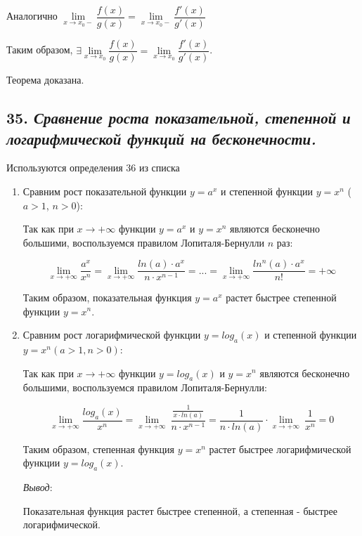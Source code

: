 Аналогично $\lim\limits_{x \rightarrow x_0-}{\dfrac{f(x)}{g(x)}}=\lim\limits_{x \rightarrow x_0-}{\dfrac{f'(x)}{g'(x)}}$

Таким образом, $\exists\lim\limits_{x \rightarrow x_0}{\dfrac{f(x)}{g(x)}}=\lim\limits_{x \rightarrow x_0}{\dfrac{f'(x)}{g'(x)}}$.

Теорема доказана.
\newpage 
\subsection*{35. \textit{Сравнение роста показательной, степенной и логарифмической функций на бесконечности.}}
\begin{Quote2} 
\small\centering 

Используются определения 36 из списка \end{Quote2} 
\begin{enumerate}

\item Сравним рост показательной функции $y = a^x$ и степенной функции $y = x^n$ ($a > 1$, $n > 0$):

Так как при $x \rightarrow +\infty$ функции $y = a^x$ и $y = x^n$ являются бесконечно большими, воспользуемся правилом Лопиталя-Бернулли $n$ раз:

$$\lim\limits_{x \rightarrow +\infty}{\dfrac{a^x}{x^n}} = \lim\limits_{x \rightarrow +\infty}{\dfrac{ln(a)\cdot a^x}{n\cdot x^{n - 1}}} =...=\lim\limits_{x \rightarrow +\infty}{\dfrac{ln^n(a)\cdot a^x}{n!}} = +\infty
    $$

Таким образом, показательная функция $y = a^x$ растет быстрее степенной функции $y = x^n$.
\item Сравним рост логарифмической функции $y = log_a(x)$ и степенной функции $y = x^n (a > 1, n > 0)$:

Так как при $x \rightarrow +\infty$ функции $y  = log_a(x)$ и $y = x^n$ являются бесконечно большими, воспользуемся правилом Лопиталя-Бернулли:

$$\lim\limits_{x \rightarrow +\infty}{\dfrac{ log_a(x)}{x^n}} 
    = \lim\limits_{x \rightarrow +\infty}{\ \dfrac{\frac{1}{x\cdot ln(a)}}{n\cdot x^{n - 1}}} 
    =\dfrac{1}{n\cdot ln(a)}\cdot \lim\limits_{x \rightarrow +\infty}{\ \dfrac{1}{x^{n}}}
    = 0
    $$

Таким образом, степенная функция $y = x^n$ растет быстрее логарифмической функции $y  = log_a(x)$.

\textit{Вывод}:

Показательная функция растет быстрее степенной, а степенная - быстрее логарифмической.

\end{enumerate}
\newpage 
